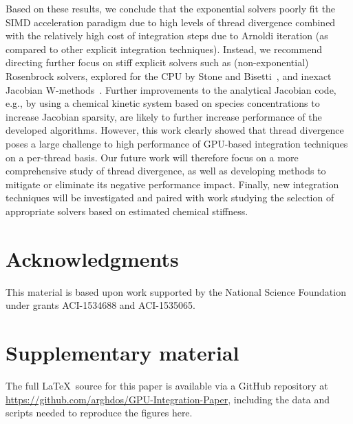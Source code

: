 \documentclass[preprint,review,11pt]{elsarticle}
\begin{document}
Based on these results, we conclude that the exponential solvers poorly fit the SIMD acceleration paradigm due to high levels of thread divergence combined with the relatively high cost of integration steps due to Arnoldi iteration (as compared to other explicit integration techniques).
Instead, we recommend directing further focus on stiff explicit solvers such as (non-exponential) Rosenbrock solvers, explored for the CPU by Stone and Bisetti~\cite{stone2014comparison}, and inexact Jacobian W-methods~\cite{steihaug1979attempt,Schmitt2004}.
Further improvements to the analytical Jacobian code, e.g., by using a chemical kinetic system based on species concentrations to increase Jacobian sparsity, are likely to further increase performance of the developed algorithms.
However, this work clearly showed that thread divergence poses a large challenge to high performance of GPU-based integration techniques on a per-thread basis.
Our future work will therefore focus on a more comprehensive study of thread divergence, as well as developing methods to mitigate or eliminate its negative performance impact.
Finally, new integration techniques will be investigated and paired with work studying the selection of appropriate solvers based on estimated chemical stiffness.


\section*{Acknowledgments}

This material is based upon work supported by the National Science Foundation under grants ACI-1534688 and ACI-1535065.

\appendix
\setcounter{figure}{0}

\renewcommand*{\thesection}{\appendixname~\Alph{section}}

\section{Supplementary material}
\label{S:supp}

The full \LaTeX\ source for this paper is available via a GitHub repository at \url{https://github.com/arghdos/GPU-Integration-Paper}, including the data and scripts needed to reproduce the figures here.
\end{document}
